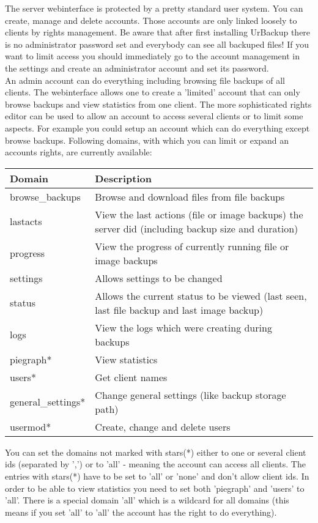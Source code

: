 \documentclass[a4paper,10pt]{article}
\begin{document}
The server webinterface is protected by a pretty standard user system. You can create, manage and delete accounts. Those accounts are only linked loosely to clients by rights management. Be aware that after first installing UrBackup there is no administrator password set and everybody can see all backuped files! If you want to limit access you should immediately go to the account management in the settings and create an administrator account and set its password.\\
An admin account can do everything including browsing file backups of all clients. The webinterface allows one to create a 'limited' account that can only browse backups and view statistics from one client. The more sophisticated rights editor can be used to allow an account to access several clients or to limit some aspects. For example you could setup an account which can do everything except browse backups.
Following domains, with which you can limit or expand an accounts rights, are currently available:

\begin{tabular}{|l|p{}|}
\hline
Domain  & Description \\
\hline\hline
browse\_backups & Browse and download files from file backups\\
lastacts & View the last actions (file or image backups) the server did (including backup size and duration)\\
progress & View the progress of currently running file or image backups\\
settings & Allows settings to be changed\\
status & Allows the current status to be viewed (last seen, last file backup and last image backup)\\
logs & View the logs which were creating during backups\\
piegraph* & View statistics\\
users* & Get client names\\
general\_settings* & Change general settings (like backup storage path)\\
usermod* & Create, change and delete users\\
\hline
\end{tabular}

You can set the domains not marked with stars(*) either to one or several client ids (separated by ',') or to 'all' - meaning the account can access all clients. The entries with stars(*) have to be set to 'all' or 'none' and don't allow client ids. In order to be able to view statistics you need to set both 'piegraph' and 'users' to 'all'. There is a special domain 'all' which is a wildcard for all domains (this means if you set 'all' to 'all' the account has the right to do everything). 
\end{document}
